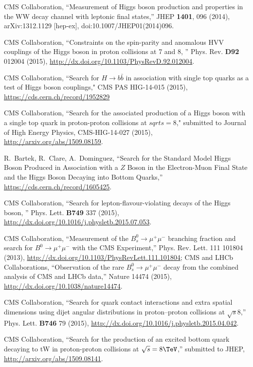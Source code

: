 \begin{thebibliography}{99}
CMS Collaboration, ``Measurement of Higgs boson production and properties in the WW decay channel with leptonic final states,'' JHEP {\bf 1401}, 096 (2014), arXiv:1312.1129 [hep-ex], doi:10.1007/JHEP01(2014)096.

CMS Collaboration, ``Constraints on the spin-parity and anomalous HVV couplings of the Higgs boson in proton collisions at 7 and 8\TeV, '' Phys. Rev. {\bf D92} 012004 (2015),
\url{http://dx.doi.org/10.1103/PhysRevD.92.012004}.

 CMS Collaboration, ``Search for $H \to b\bar{b}$ in association with single top quarks as a test of Higgs boson couplings," CMS PAS HIG-14-015 (2015), \url{https://cds.cern.ch/record/1952829}

 CMS Collaboration, ``Search for the associated production of a Higgs boson with a single top quark in proton-proton collisions at $sqrt{s} = 8$\TeV," submitted to Journal of High Energy Physics, CMS-HIG-14-027 (2015), \url{http://arxiv.org/abs/1509.08159}.

 R.~Bartek, R.~Clare, A.~Dominguez, ``Search for the Standard Model Higgs Boson Produced in Association with a $Z$ Boson in the Electron-Muon Final State and the Higgs Boson Decaying into Bottom Quarks,'' \url{https://cds.cern.ch/record/1605425}.
 
 CMS Collaboration, ``Search for lepton-flavour-violating decays of the Higgs boson, '' Phys. Lett. {\bf B749} 337 (2015), \url{http://dx.doi.org/10.1016/j.physletb.2015.07.053}.
 
 CMS Collaboration, ``Measurement of the $B^0_s \to \mu^+\mu^-$ branching fraction and search for $B^0 \to \mu^+\mu^−$ with the CMS Experiment,'' Phys. Rev. Lett. 111 101804 (2013), \url{http://dx.doi.org/10.1103/PhysRevLett.111.101804};
CMS and LHCb Collaborations, ``Observation of the rare $B^0_s \to \mu^+\mu^−$ decay from the combined analysis of CMS and LHCb data,'' Nature 14474 (2015), \url{http://dx.doi.org/10.1038/nature14474}.


CMS Collaboration, ``Search for quark contact interactions and extra spatial dimensions using dijet angular distributions in proton–proton collisions at $\sqrt{s}$8\TeV,'' Phys. Lett. {\bf B746} 79 (2015), \url{http://dx.doi.org/10.1016/j.physletb.2015.04.042}.

CMS Collaboration, ``Search for the production of an excited bottom quark decaying to tW in proton-proton collisions at $\sqrt{s} = 8\TeV$,'' submitted to JHEP, \url{http://arxiv.org/abs/1509.08141}.




\end{thebibliography}
